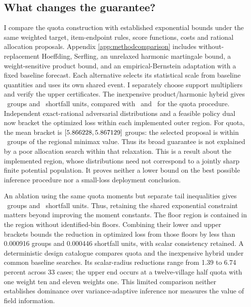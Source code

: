 \documentclass[11pt]{article}
\begin{document}
\subsection{What changes the guarantee?}

I compare the quota construction with established exponential bounds under the same weighted target, item-endpoint rules, score functions, costs and rational allocation proposals. Appendix \ref{app:methodcomparison} includes without-replacement Hoeffding, Serfling, an unrelaxed harmonic martingale bound, a weight-sensitive product bound, and an empirical-Bernstein adaptation with a fixed baseline forecast. Each alternative selects its statistical scale from baseline quantities and uses its own shared event. I separately choose support multipliers and verify the upper certificates. The inexpensive product/harmonic hybrid gives \HybridMeanCertificate\ groups and \HybridShortfallCertificate\ shortfall units, compared with \QuotaMeanLoss\ and \QuotaShortfallLoss\ for the quota procedure. Independent exact-rational adversarial distributions and a feasible policy dual now bracket the optimized loss within each implemented outer region. For quota, the mean bracket is $[5.866228,5.867129]$ groups: the selected proposal is within \QuotaRegionalMeanGap\ groups of the regional minimax value. Thus its broad guarantee is not explained by a poor allocation search within that relaxation. This is a result about the implemented region, whose distributions need not correspond to a jointly sharp finite potential population. It proves neither a lower bound on the best possible inference procedure nor a small-loss deployment conclusion.

An ablation using the same quota moments but separate tail inequalities gives \SeparateQuotaMeanCertificate\ groups and \SeparateQuotaShortfallCertificate\ shortfall units. Thus, retaining the shared exponential constraint matters beyond improving the moment constants. The floor region is contained in the region without identified-bin floors. Combining their lower and upper brackets bounds the reduction in optimized loss from those floors by less than 0.000916 groups and 0.000446 shortfall units, with scalar consistency retained. A deterministic design catalogue compares quota and the inexpensive hybrid under common baseline searches. Its scalar-radius reductions range from 1.39 to 6.74 percent across 33 cases; the upper end occurs at a twelve-village half quota with one weight ten and eleven weights one. This limited comparison neither establishes dominance over variance-adaptive inference nor measures the value of field information.
\end{document}
